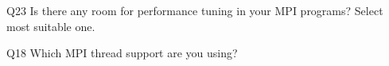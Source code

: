 \begin{description}%
\item{Q23} Is there any room for performance tuning in your MPI programs? Select most suitable one.%
\item{Q18} Which MPI thread support are you using?%
\end{description}%

